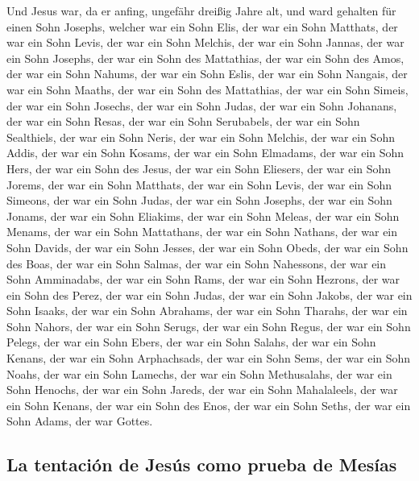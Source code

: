  Und Jesus war, da er anfing, ungefähr dreißig Jahre alt,
und ward gehalten für einen Sohn Josephs, welcher war ein Sohn Elis,
 der war ein Sohn Matthats, der war ein Sohn Levis, der
war ein Sohn Melchis, der war ein Sohn Jannas, der war ein Sohn Josephs,
 der war ein Sohn des Mattathias, der war ein Sohn des
Amos, der war ein Sohn Nahums, der war ein Sohn Eslis, der war ein Sohn
Nangais,  der war ein Sohn Maaths, der war ein Sohn des
Mattathias, der war ein Sohn Simeis, der war ein Sohn Josechs, der war
ein Sohn Judas,  der war ein Sohn Johanans, der war ein
Sohn Resas, der war ein Sohn Serubabels, der war ein Sohn Sealthiels,
der war ein Sohn Neris,  der war ein Sohn Melchis, der
war ein Sohn Addis, der war ein Sohn Kosams, der war ein Sohn Elmadams,
der war ein Sohn Hers,  der war ein Sohn des Jesus, der
war ein Sohn Eliesers, der war ein Sohn Jorems, der war ein Sohn
Matthats, der war ein Sohn Levis,  der war ein Sohn
Simeons, der war ein Sohn Judas, der war ein Sohn Josephs, der war ein
Sohn Jonams, der war ein Sohn Eliakims,  der war ein Sohn
Meleas, der war ein Sohn Menams, der war ein Sohn Mattathans, der war
ein Sohn Nathans, der war ein Sohn Davids,  der war ein
Sohn Jesses, der war ein Sohn Obeds, der war ein Sohn des Boas, der war
ein Sohn Salmas, der war ein Sohn Nahessons,  der war ein
Sohn Amminadabs, der war ein Sohn Rams, der war ein Sohn Hezrons, der
war ein Sohn des Perez, der war ein Sohn Judas,  der war
ein Sohn Jakobs, der war ein Sohn Isaaks, der war ein Sohn Abrahams, der
war ein Sohn Tharahs, der war ein Sohn Nahors,  der war
ein Sohn Serugs, der war ein Sohn Regus, der war ein Sohn Pelegs, der
war ein Sohn Ebers, der war ein Sohn Salahs,  der war ein
Sohn Kenans, der war ein Sohn Arphachsads, der war ein Sohn Sems, der
war ein Sohn Noahs, der war ein Sohn Lamechs,  der war
ein Sohn Methusalahs, der war ein Sohn Henochs, der war ein Sohn Jareds,
der war ein Sohn Mahalaleels, der war ein Sohn Kenans, 
der war ein Sohn des Enos, der war ein Sohn Seths, der war ein Sohn
Adams, der war Gottes.

\hypertarget{la-tentaciuxf3n-de-jesuxfas-como-prueba-de-mesuxedas}{%
\subsection{La tentación de Jesús como prueba de
Mesías}\label{la-tentaciuxf3n-de-jesuxfas-como-prueba-de-mesuxedas}}


